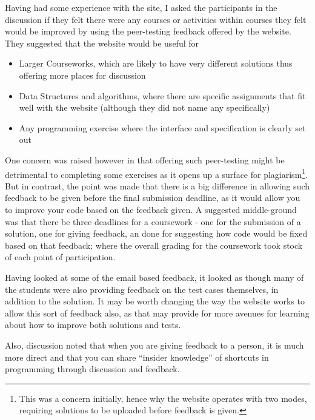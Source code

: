 \documentclass[a4paper,11pt]{report}
\begin{document}
Having had some experience with the site, I asked the participants in the discussion if they felt there were any courses or activities within courses they felt would be improved by using the peer-testing feedback offered by the website. They suggested that the website would be useful for
\begin{itemize}
\item Larger Courseworks, which are likely to have very different solutions thus offering more places for discussion
\item Data Structures and algorithms, where there are specific assignments that fit well with the website (although they did not name any specifically)
\item Any programming exercise where the interface and specification is clearly set out
\end{itemize}
One concern was raised however in that offering such peer-testing might be detrimental to completing some exercises as it opens up a surface for plagiarism\footnote{This was a concern initially, hence why the website operates with two modes, requiring solutions to be uploaded before feedback is given.}. But in contrast, the point was made that there is a big difference in allowing such feedback to be given before the final submission deadline, as it would allow you to improve your code based on the feedback given. A suggested middle-ground was that there be three deadlines for a coursework - one for the submission of a solution, one for giving feedback, an done for suggesting how code would be fixed based on that feedback; where the overall grading for the coursework took stock of each point of participation.\par
Having looked at some of the email based feedback, it looked as though many of the students were also providing feedback on the test cases themselves, in addition to the solution. It may be worth changing the way the website works to allow this sort of feedback also, as that may provide for more avenues for learning about how to improve both solutions and tests.\par
Also, discussion noted that when you are giving feedback to a person, it is much more direct and that you can share ``insider knowledge'' of shortcuts in programming through discussion and feedback.\par
\end{document}
